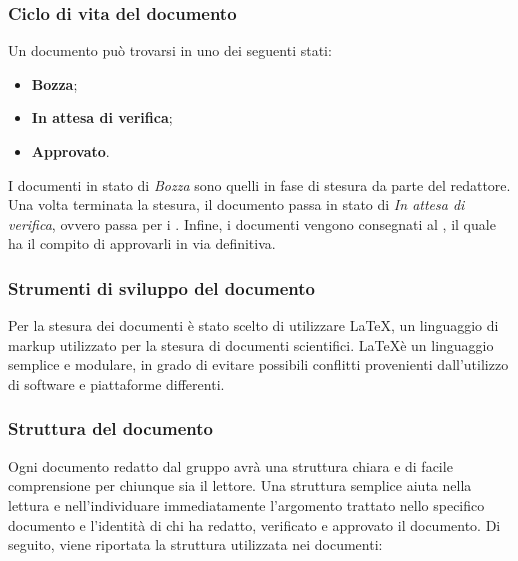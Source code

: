 		\subsubsection{Ciclo di vita del documento}
		Un documento può trovarsi in uno dei seguenti stati:
		\begin{itemize}
			\item \textbf{Bozza};
			\item \textbf{In attesa di verifica};
			\item \textbf{Approvato}.
		\end{itemize}
		
		I documenti in stato di \textit{Bozza} sono quelli in fase di stesura da parte del redattore. Una volta terminata la stesura, il documento passa in stato di \textit{In attesa di verifica}, ovvero passa per i \textit{\Vers}. Infine, i documenti vengono consegnati al \textit{\RdP}, il quale ha il compito di approvarli in via definitiva.
		
		\subsubsection{Strumenti di sviluppo del documento}
		Per la stesura dei documenti è stato scelto di utilizzare \LaTeX, un linguaggio di markup utilizzato per la stesura di documenti scientifici. \LaTeX è un linguaggio semplice e modulare, in grado di evitare possibili conflitti provenienti dall'utilizzo di software e piattaforme differenti.
	
		\subsubsection{Struttura del documento}
		Ogni documento redatto dal gruppo avrà una struttura chiara e di facile comprensione per chiunque sia il lettore. Una struttura semplice aiuta nella lettura e nell'individuare immediatamente l'argomento trattato nello specifico documento e l'identità di chi ha redatto, verificato e approvato il documento.
		Di seguito, viene riportata la struttura utilizzata nei documenti:

